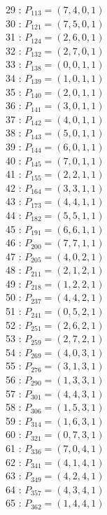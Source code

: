 \documentclass{article}
\begin{document}
{\begin{multicols}{3}
29 : $P_{113}=( 7, 4, 0, 1 )$\\
30 : $P_{121}=( 7, 5, 0, 1 )$\\
31 : $P_{124}=( 2, 6, 0, 1 )$\\
32 : $P_{132}=( 2, 7, 0, 1 )$\\
33 : $P_{138}=( 0, 0, 1, 1 )$\\
34 : $P_{139}=( 1, 0, 1, 1 )$\\
35 : $P_{140}=( 2, 0, 1, 1 )$\\
36 : $P_{141}=( 3, 0, 1, 1 )$\\
37 : $P_{142}=( 4, 0, 1, 1 )$\\
38 : $P_{143}=( 5, 0, 1, 1 )$\\
39 : $P_{144}=( 6, 0, 1, 1 )$\\
40 : $P_{145}=( 7, 0, 1, 1 )$\\
41 : $P_{155}=( 2, 2, 1, 1 )$\\
42 : $P_{164}=( 3, 3, 1, 1 )$\\
43 : $P_{173}=( 4, 4, 1, 1 )$\\
44 : $P_{182}=( 5, 5, 1, 1 )$\\
45 : $P_{191}=( 6, 6, 1, 1 )$\\
46 : $P_{200}=( 7, 7, 1, 1 )$\\
47 : $P_{205}=( 4, 0, 2, 1 )$\\
48 : $P_{211}=( 2, 1, 2, 1 )$\\
49 : $P_{218}=( 1, 2, 2, 1 )$\\
50 : $P_{237}=( 4, 4, 2, 1 )$\\
51 : $P_{241}=( 0, 5, 2, 1 )$\\
52 : $P_{251}=( 2, 6, 2, 1 )$\\
53 : $P_{259}=( 2, 7, 2, 1 )$\\
54 : $P_{269}=( 4, 0, 3, 1 )$\\
55 : $P_{276}=( 3, 1, 3, 1 )$\\
56 : $P_{290}=( 1, 3, 3, 1 )$\\
57 : $P_{301}=( 4, 4, 3, 1 )$\\
58 : $P_{306}=( 1, 5, 3, 1 )$\\
59 : $P_{314}=( 1, 6, 3, 1 )$\\
60 : $P_{321}=( 0, 7, 3, 1 )$\\
61 : $P_{336}=( 7, 0, 4, 1 )$\\
62 : $P_{341}=( 4, 1, 4, 1 )$\\
63 : $P_{349}=( 4, 2, 4, 1 )$\\
64 : $P_{357}=( 4, 3, 4, 1 )$\\
65 : $P_{362}=( 1, 4, 4, 1 )$\\

\end{multicols}}
\end{document}

